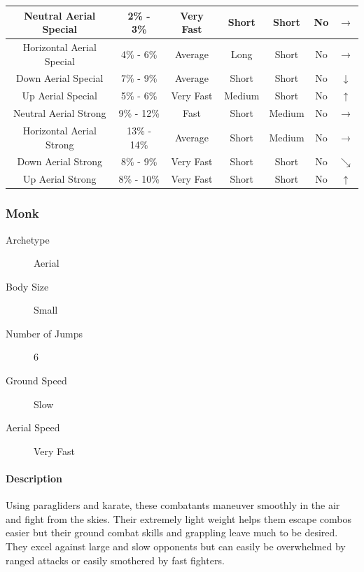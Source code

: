 \begin{table}[h!]
\begin{tabular}{| c | c | c | c | c | c | c |}
        Neutral Aerial Special & 2\% - 3\% & Very Fast & Short & Short & No & $\rightarrow$ \\
        \hline
        Horizontal Aerial Special & 4\% - 6\% & Average & Long & Short & No & $\rightarrow$ \\
        \hline
        Down Aerial Special & 7\% - 9\% & Average & Short & Short & No & $\downarrow$ \\
        \hline
        Up Aerial Special & 5\% - 6\% & Very Fast & Medium & Short & No & $\uparrow$ \\
        \hline
        Neutral Aerial Strong & 9\% - 12\% & Fast & Short & Medium & No & $\rightarrow$ \\
        \hline
        Horizontal Aerial Strong & 13\% - 14\% & Average & Short & Medium & No & $\rightarrow$ \\
        \hline
        Down Aerial Strong & 8\% - 9\% & Very Fast & Short & Short & No & $\searrow$ \\
        \hline
        Up Aerial Strong & 8\% - 10\% & Very Fast & Short & Short & No & $\uparrow$ \\
        \hline
    \end{tabular}
\end{table}

\pagebreak

\subsubsection{Monk}

\begin{description}
    \item[Archetype] Aerial
    \item[Body Size] Small
    \item[Number of Jumps] 6
    \item[Ground Speed] Slow
    \item[Aerial Speed] Very Fast 
\end{description}

\paragraph{Description} Using paragliders and karate, these combatants maneuver smoothly in the air and fight from the skies. Their extremely light weight helps them escape combos easier but their ground combat skills and grappling leave much to be desired. They excel against large and slow opponents but can easily be overwhelmed by ranged attacks or easily smothered by fast fighters.

